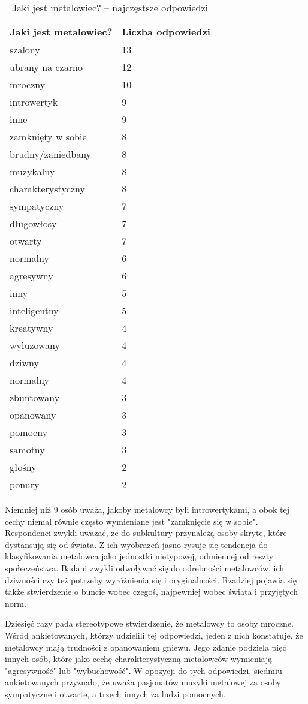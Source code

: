 \documentclass[12pt, a4paper, titlepage]{report}
\begin{document}
\begin{table}
\begin{tabular}{ m{23em} | m{5em} } 
\textbf{Jaki jest metalowiec?
} & Liczba odpowiedzi \\
\hline
szalony	& 13 \\
ubrany na czarno & 12 \\
mroczny	& 10\\
introwertyk & 9\\
inne & 9\\
zamknięty w sobie & 8\\
brudny/zaniedbany &	8\\
muzykalny & 8\\
charakterystyczny & 8\\
sympatyczny	& 7\\
długowłosy	& 7\\
otwarty	& 7\\
normalny & 6\\
agresywny & 6\\
inny & 5\\
inteligentny & 5\\
kreatywny & 4\\
wyluzowany & 4\\
dziwny	& 4\\
normalny & 4\\
zbuntowany & 3\\
opanowany & 3\\
pomocny	& 3\\
samotny	& 3\\
głośny & 2\\
ponury & 2\\
\end{tabular} 
\caption{Jaki jest metalowiec? -- najczęstsze odpowiedzi}
\label{table:1}
\end{table}


Niemniej niż 9 osób uważa, jakoby metalowcy byli introwertykami, a obok tej cechy niemal równie często wymieniane jest "zamknięcie się w sobie".  Respondenci zwykli uważać, że do subkultury przynależą osoby skryte, które dystansują się od świata. Z ich wyobrażeń jasno rysuje się tendencja do klasyfikowania metalowca jako jednostki  nietypowej, odmiennej od reszty społeczeństwa. Badani zwykli odwoływać się do odrębności metalowców, ich dziwności czy też potrzeby wyróżnienia się i oryginalności. Rzadziej pojawia się także stwierdzenie o buncie wobec czegoś, najpewniej wobec świata i przyjętych norm. 

Dziesięć razy pada stereotypowe stwierdzenie, że metalowcy to osoby mroczne. Wśród ankietowanych, którzy udzielili tej odpowiedzi, jeden z nich konstatuje, że metalowcy mają trudności z opanowaniem gniewu. Jego zdanie podziela pięć innych osób, które jako cechę charakterystyczną metalowców wymieniają "agresywność" lub "wybuchowość". W opozycji do tych odpowiedzi, siedmiu ankietowanych przyznało, że uważa pasjonatów muzyki metalowej za osoby sympatyczne i otwarte, a trzech innych za ludzi pomocnych. 
\end{document}

